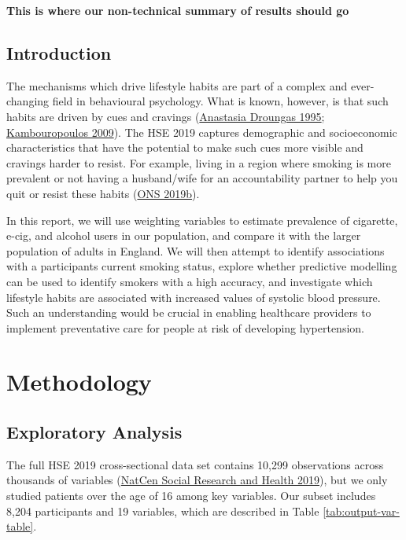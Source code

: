 \documentclass[
  11pt,
  twocolumn]{article}
\begin{document}
\textbf{This is where our non-technical summary of results should go}

\hypertarget{introduction}{%
\subsection{Introduction}\label{introduction}}

The mechanisms which drive lifestyle habits are part of a complex and
ever-changing field in behavioural psychology. What is known, however,
is that such habits are driven by cues and cravings
(\protect\hyperlink{ref-SmokeCue}{Anastasia Droungas 1995};
\protect\hyperlink{ref-DrinkCue}{Kambouropoulos 2009}). The HSE 2019
captures demographic and socioeconomic characteristics that have the
potential to make such cues more visible and cravings harder to resist.
For example, living in a region where smoking is more prevalent or not
having a husband/wife for an accountability partner to help you quit or
resist these habits (\protect\hyperlink{ref-AccountPartner}{ONS 2019b}).

In this report, we will use weighting variables to estimate prevalence
of cigarette, e-cig, and alcohol users in our population, and compare it
with the larger population of adults in England. We will then attempt to
identify associations with a participants current smoking status,
explore whether predictive modelling can be used to identify smokers
with a high accuracy, and investigate which lifestyle habits are
associated with increased values of systolic blood pressure. Such an
understanding would be crucial in enabling healthcare providers to
implement preventative care for people at risk of developing
hypertension.

\hypertarget{methodology}{%
\section{Methodology}\label{methodology}}

\hypertarget{exploratory-analysis}{%
\subsection{Exploratory Analysis}\label{exploratory-analysis}}

The full HSE 2019 cross-sectional data set contains 10,299 observations
across thousands of variables (\protect\hyperlink{ref-Main}{NatCen
Social Research and Health 2019}), but we only studied patients over the
age of 16 among key variables. Our subset includes 8,204 participants
and 19 variables, which are described in Table
\ref{tab:output-var-table}.
\end{document}
